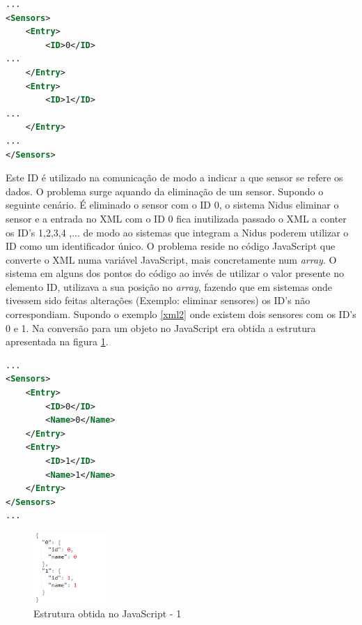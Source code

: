 \begin{lstlisting}[caption=Estrutura parcial do XML da Nidus(Sensores),label={xml1},language=XML]
...
<Sensors>
    <Entry>
        <ID>0</ID>
...
    </Entry>
    <Entry>
        <ID>1</ID>
...
    </Entry>
...
</Sensors>
\end{lstlisting}




\par Este ID é utilizado na comunicação de modo a indicar a que sensor se refere os dados. O problema surge aquando da eliminação de um sensor. Supondo o seguinte cenário. É eliminado o sensor com o ID 0, o sistema Nidus eliminar o sensor e a entrada no XML com o ID 0 fica inutilizada passado o XML a conter os ID's 1,2,3,4 ,... de modo ao sistemas que integram a Nidus poderem utilizar o ID como um identificador único. O problema reside no código JavaScript que converte o XML numa variável JavaScript, mais concretamente num \textit{array}. O sistema em alguns dos pontos do código ao invés de utilizar o valor presente no elemento ID, utilizava a sua posição no \textit{array}, fazendo que em sistemas onde tivessem sido feitas alterações (Exemplo: eliminar sensores) os ID's não correspondiam. Supondo o exemplo \ref{xml2} onde existem dois sensores com os ID's 0 e 1. Na conversão para um objeto no JavaScript era obtida a estrutura apresentada na figura \ref{estruct1}.

\begin{lstlisting}[caption=Exemplo do XML antes da eliminação de Sensores,label={xml2},language=XML]
...
<Sensors>
    <Entry>
        <ID>0</ID>
        <Name>0</Name>
    </Entry>
    <Entry>
        <ID>1</ID>
        <Name>1</Name>
    </Entry>
</Sensors>
...
\end{lstlisting}

\begin{figure}[ht]
\centering
\includegraphics[width=0.25\textwidth]{images/estructu1.png}
\caption{Estrutura obtida no JavaScript - 1}\label{estruct1}
\end{figure}

